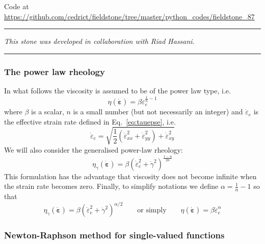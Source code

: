 

\begin{center}
Code at \url{https://github.com/cedrict/fieldstone/tree/master/python_codes/fieldstone_87}
\end{center}

\par\noindent\rule{\textwidth}{0.4pt}

{\sl This stone was developed in collaboration with Riad Hassani}. 

\par\noindent\rule{\textwidth}{0.4pt}

\subsubsection*{The power law rheology}

In what follows the viscosity 
is assumed to be of the power law type, i.e.
\[
\eta(\dot{\bm \varepsilon}) = \beta  \dot{\varepsilon}_e^{\frac1n-1}
\]
where $\beta$ is a scalar, $n$ is a small number (but not 
necessarily an integer) and
$\dot{\varepsilon}_e$ is the effective strain rate defined in Eq.~\eqref{eq:tauepse},
i.e.
\[
\dot\varepsilon_e = \sqrt{ \frac{1}{2}(\dot\varepsilon_{xx}^2 + \dot\varepsilon_{yy}^2 ) 
+ \dot\varepsilon_{xy}^2}
\]
We will also consider the generalised power-law rheology:
\[
\eta_{\dot\gamma}(\dot{\bm \varepsilon})  = \beta  ( \dot{\varepsilon}_e^2 + \dot\gamma^2)^{\frac{1-n}{2n}}
\]
This formulation has the advantage that viscosity does not become infinite 
when the strain rate becomes zero.
Finally, to simplify notations we define $\alpha=\frac1n-1$ so that 
\[
\boxed{
\eta_{\dot\gamma}(\dot{\bm \varepsilon})  = \beta  ( \dot{\varepsilon}_e^2 + \dot\gamma^2)^{\alpha/2}
}
\qquad
\text{or simply}
\qquad
\boxed{
\eta(\dot{\bm \varepsilon})  = \beta  \dot{\varepsilon}_e^\alpha
}
\]




 

\subsubsection*{Newton-Raphson method for single-valued functions}

